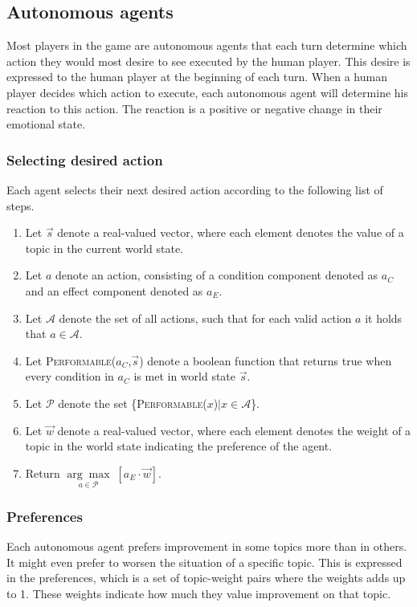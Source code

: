 \documentclass[11pt,a4paper]{article}
\newcommand{\argmax}[1]{\underset{#1}{\operatorname{arg}\operatorname{max}}\;}
\begin{document}
  \subsection{Autonomous agents}
    Most players in the game are autonomous agents that each turn determine which action they would most desire to see executed by the human player. This desire is expressed to the human player at the beginning of each turn. When a human player decides which action to execute, each autonomous agent will determine his reaction to this action. The reaction is a positive or negative change in their emotional state.
    \subsubsection{Selecting desired action}
      Each agent selects their next desired action according to the following list of steps.
      \begin{enumerate}
        \item Let $\vec{s}$ denote a real-valued vector, where each element denotes the value of a topic in the current world state.
        \item Let $a$ denote an action, consisting of a condition component denoted as $a_C$ and an effect component denoted as $a_E$.
        \item Let $\mathcal{A}$ denote the set of all actions, such that for each valid action $a$ it holds that $a \in \mathcal{A}$.
        \item Let \textsc{Performable}($a_C$,$\vec{s}$) denote a boolean function that returns true when every condition in $a_C$ is met in world state $\vec{s}$.
        \item Let $\mathcal{P}$ denote the set \{\textsc{Performable}($x$)$\vert x \in \mathcal{A}$\}.
        \item Let $\vec{w}$ denote a real-valued vector, where each element denotes the weight of a topic in the world state indicating the preference of the agent.

        \item Return $\argmax{a \in \mathcal{P}} \left[ a_E \cdot \vec{w} \right]$.
      \end{enumerate}
    \subsubsection{Preferences}
      Each autonomous agent prefers improvement in some topics more than in others. It might even prefer to worsen the situation of a specific topic. This is expressed in the preferences, which is a set of topic-weight pairs where the weights adds up to 1. These weights indicate how much they value improvement on that topic.
\end{document}

